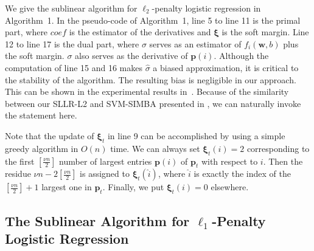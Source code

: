 \documentclass{llncs}
\newcommand{\bw}{\mathbf{w}}
\newcommand{\bp}{\mathbf{p}}
\newcommand{\bxi}{\mathbf{\xi}}
\newcommand{\lc}{\left(}
\newcommand{\rc}{\right)}
\newcommand{\li}{\lc i\rc}
\begin{document}
We give the sublinear algorithm for $\ell_2$-penalty logistic regression in Algorithm~1.	
In the pseudo-code of Algorithm~1, line 5 to line 11 is the primal part, where $coef$ is the estimator of the derivatives and $\bxi$ is the soft margin.
Line 12 to line 17 is the dual part, where $\sigma$ serves as an estimator of $f_i\lc\bw,b\rc$ plus the soft margin. $\sigma$ also serves as the derivative of $\bp(i)$.
Although the computation of line 15 and 16 makes $\hat{\sigma}$ a biased approximation, it is critical to the stability of the algorithm.
The resulting bias is negligible in our approach. This can be shown in the experimental results in~\cite{hazanbeating}.
Because of the similarity between our SLLR-L2 and SVM-SIMBA presented in \cite{hazanbeating}, we can naturally invoke the statement here.

Note that the update of ${\bxi}_{t}$ in line 9 can be accomplished by using a simple greedy algorithm in $O(n)$ time.
We can always set ${\bxi}_{t}\li=2$ corresponding to the first $[\frac{\nu n}{2}]$ number of largest entries $\bp\li$ of ${\bp}_{t}$ with respect to $i$.
Then the residue $\nu n-2[\frac{\nu n}{2}]$ is assigned to ${\bxi}_{t}(\hat{i})$, where $\hat{i}$ is exactly the index of the $[\frac{\nu n}{2}]+1$ largest one in $\bp_t$.
Finally, we put ${\bxi}_{t}\li=0$ elsewhere.
	
\subsection{The Sublinear Algorithm for $\ell_1$-Penalty Logistic Regression}
	
\end{document}
